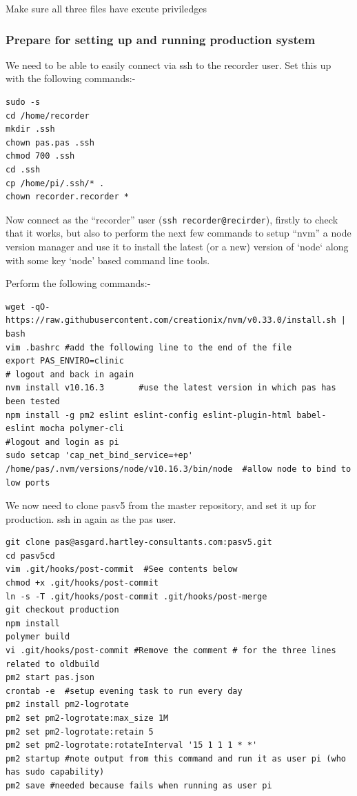 \documentclass[Draft]{akc}
\begin{document}
Make sure all three files have excute priviledges


\subsubsection{Prepare for setting up and running production system}

We need to be able to easily connect via ssh to the recorder user.  Set this up with
the following commands:-

\begin{lstlisting}
sudo -s
cd /home/recorder
mkdir .ssh
chown pas.pas .ssh
chmod 700 .ssh
cd .ssh
cp /home/pi/.ssh/* .
chown recorder.recorder *
\end{lstlisting}

Now connect as the ``recorder'' user (\texttt{ssh recorder@recirder}), firstly to check that it works, but also
to perform the next few commands to setup ``nvm'' a node version manager and use it to install the latest
(or a new) version of `node` along with some key `node' based command line tools.

Perform the following commands:-

\begin{lstlisting}
wget -qO- https://raw.githubusercontent.com/creationix/nvm/v0.33.0/install.sh | bash
vim .bashrc #add the following line to the end of the file
export PAS_ENVIRO=clinic
# logout and back in again
nvm install v10.16.3       #use the latest version in which pas has been tested
npm install -g pm2 eslint eslint-config eslint-plugin-html babel-eslint mocha polymer-cli
#logout and login as pi
sudo setcap 'cap_net_bind_service=+ep' /home/pas/.nvm/versions/node/v10.16.3/bin/node  #allow node to bind to low ports
\end{lstlisting}

We now need to clone pasv5 from the master repository, and set it up for production.  ssh in again as the pas user.

\begin{lstlisting}
git clone pas@asgard.hartley-consultants.com:pasv5.git
cd pasv5cd
vim .git/hooks/post-commit  #See contents below
chmod +x .git/hooks/post-commit
ln -s -T .git/hooks/post-commit .git/hooks/post-merge
git checkout production
npm install
polymer build
vi .git/hooks/post-commit #Remove the comment # for the three lines related to oldbuild
pm2 start pas.json
crontab -e  #setup evening task to run every day
pm2 install pm2-logrotate
pm2 set pm2-logrotate:max_size 1M
pm2 set pm2-logrotate:retain 5
pm2 set pm2-logrotate:rotateInterval '15 1 1 1 * *'
pm2 startup #note output from this command and run it as user pi (who has sudo capability)
pm2 save #needed because fails when running as user pi
\end{lstlisting}
\end{document}
